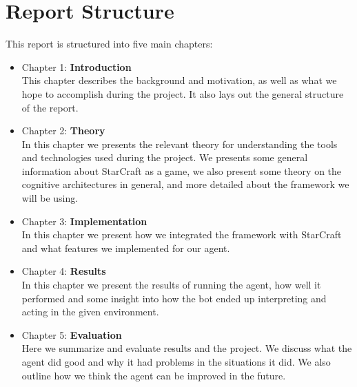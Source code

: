 \section{Report Structure}
\label{sec:structure}
This report is structured into five main chapters:
\begin{itemize}
\item Chapter 1: \textbf{Introduction} \\
This chapter describes the background and motivation, as well as what we hope to accomplish during the project. It also lays out the general structure of the report.
\item Chapter 2: \textbf{Theory} \\
In this chapter we presents the relevant theory for understanding the tools and technologies used during the project. We presents some general information about StarCraft as a game, we also present some theory on the cognitive architectures in general, and more detailed about the framework we will be using.
\item Chapter 3: \textbf{Implementation} \\
In this chapter we present how we integrated the framework with StarCraft and what features we implemented for our agent.
\item Chapter 4: \textbf{Results} \\
In this chapter we present the results of running the agent, how well it performed and some insight into how the bot ended up interpreting and acting in the given environment.
\item Chapter 5: \textbf{Evaluation} \\
Here we summarize and evaluate results and the project. We discuss what the agent did good and why it had problems in the situations it did. We also outline how we think the agent can be improved in the future.

\end{itemize}

